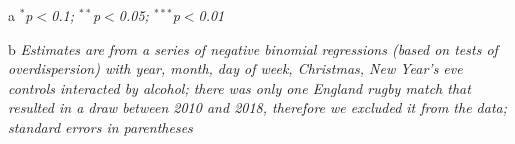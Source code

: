 \documentclass[12pt, letterpaper]{article}
\begin{document}
\begin{table}[htp]
{\begin{threeparttable}
\begin{tablenotes}
      \item[a] \textit{$^{*}$p$<$0.1; $^{**}$p$<$0.05; $^{***}$p$<$0.01}
      \item[b] \textit{Estimates are from a series of negative binomial regressions (based on tests of overdispersion)  with year, month, day of week, Christmas, New Year's eve controls interacted by alcohol; there was only one England rugby match that resulted in a draw between 2010 and 2018, therefore we excluded it from the data; standard errors in parentheses}
    \end{tablenotes}
\end{threeparttable} } 
\end{table}


\newpage

\begin{table}[htp]
\centering
 \caption{Non domestic abuse incidents that are about power}
  \label{otherabuse}
\end{table}
\end{document}
